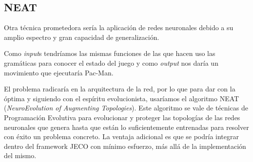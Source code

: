\subsection{NEAT}
Otra técnica prometedora sería la aplicación de redes neuronales debido a su amplio espectro y gran capacidad de generalización.

Como \textit{input}s tendríamos las mismas funciones de las que hacen uso las gramáticas para conocer el estado del juego y como \textit{output} nos daría un movimiento que ejecutaría Pac-Man.

El problema radicaría en la arquitectura de la red, por lo que para dar con la óptima y siguiendo con el espíritu evolucionista, usaríamos el algoritmo NEAT \cite{stanley2002evolving} (\textit{NeuroEvolution of Augmenting Topologies}). Este algoritmo se vale de técnicas de Programación Evolutiva para evolucionar y proteger las topologías de las redes neuronales que genera hasta que están lo suficientemente entrenadas para resolver con éxito un problema concreto. La ventaja adicional es que se podría integrar dentro del framework JECO con mínimo esfuerzo, más allá de la implementación del mismo.
